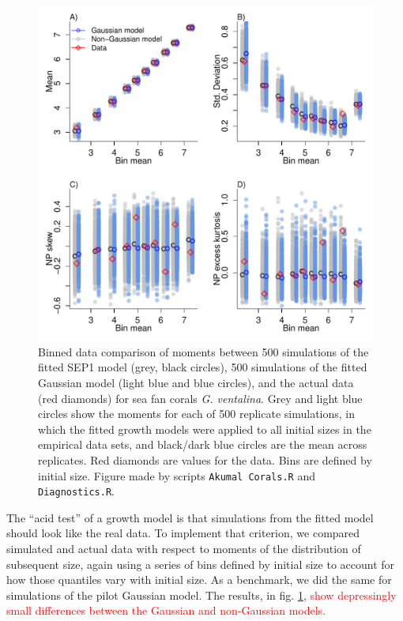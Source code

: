 \documentclass[12pt]{article}
\newcommand{\new}{\textcolor{red}}
\begin{document}
\begin{figure}[tbp]
\centering
\includegraphics[width=.95\textwidth]{figures/CoralMomentsComparePlot.pdf}
\caption{Binned data comparison of moments between 500 simulations of the fitted SEP1 model (grey, black circles), 500 simulations
of the fitted Gaussian model (light blue and blue circles), and the actual data (red diamonds) for sea fan corals \emph{G. ventalina}. 
Grey and light blue circles show the moments for each of 500 replicate simulations,
in which the fitted growth models were applied to all initial sizes in the empirical data sets, and black/dark blue circles are the mean
across replicates. Red diamonds are values for the data. Bins are defined by initial size. Figure
made by scripts \texttt{Akumal Corals.R} and \texttt{Diagnostics.R}.}
\label{fig:CoralMomentsCompare}
\end{figure} 

The ``acid test'' of a growth model is that simulations from the fitted model should look like the real data. 
To implement that criterion, we compared simulated and actual data with respect to moments of the distribution
of subsequent size, again using a series of bins defined by initial size to account for how those quantiles vary
with initial size. As a benchmark, we did the same for simulations of the pilot Gaussian model. The results, in  
fig. \ref{fig:CoralMomentsCompare}, \new{show depressingly small differences between the Gaussian and non-Gaussian models.} 
 
\end{document}
